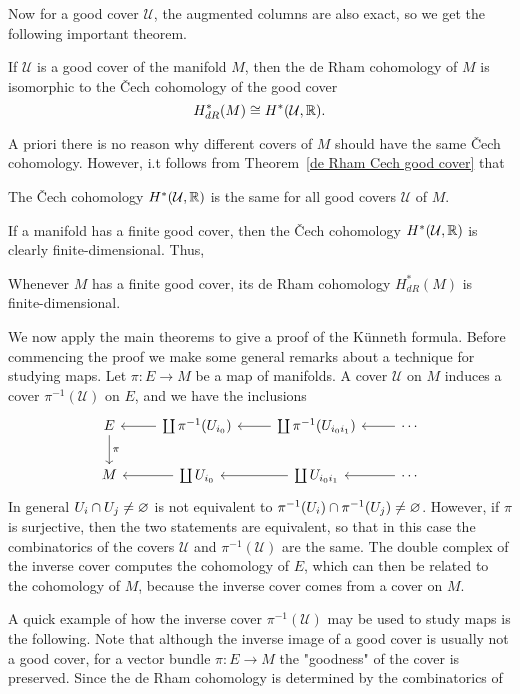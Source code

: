 Now for a good cover $\mathcal{U}$, the augmented columns are also exact, so we get the following important theorem.
\begin{theorem}\label{de Rham Cech good cover}
If $\mathcal{U}$ is a good cover of the manifold $M$, then the de Rham cohomology of $M$ is isomorphic to the \v{C}ech cohomology of the good cover
\[H^*_{dR}(M)\cong H^*(\mathcal{U},\mathbb{R}).\]
\end{theorem}
A priori there is no reason why different covers of $M$ should have the same \v{C}ech cohomology. However, i.t follows from Theorem~\ref{de Rham Cech good cover} that
\begin{corollary}
The \v{C}ech cohomology $H^*(\mathcal{U},\mathbb{R})$ is the same for all good covers $\mathcal{U}$ of $M$.
\end{corollary}
If a manifold has a finite good cover, then the \v{C}ech cohomology $H^*(\mathcal{U},\mathbb{R})$ is clearly finite-dimensional. Thus,
\begin{corollary}
Whenever $M$ has a finite good cover, its de Rham cohomology $H^*_{dR}(M)$ is finite-dimensional.
\end{corollary}
We now apply the main theorems to give a proof of the K\"unneth formula. Before commencing the proof we make some general remarks about a technique for studying maps. 
Let $\pi:E\to M$ be a map of manifolds. A cover $\mathcal{U}$ on $M$ induces a cover $\pi^{-1}(\mathcal{U})$ on $E$, and we have the inclusions
\[\begin{tikzcd}
E\ar[d,"\pi"]&\coprod\pi^{-1}(U_{i_0})\ar[l]&\coprod\pi^{-1}(U_{i_0i_1})\ar[l]&\cdots\ar[l]\\
M&\coprod U_{i_0}\ar[l]&\coprod U_{i_0i_1}\ar[l]&\cdots\ar[l]
\end{tikzcd}\]
In general $U_i\cap U_j\neq\varnothing$ is not equivalent to $\pi^{-1}(U_i)\cap \pi^{-1}(U_j)\neq\varnothing$. However, if $\pi$ is surjective, then the two statements are equivalent, 
so that in this case the combinatorics of the covers $\mathcal{U}$ and $\pi^{-1}(\mathcal{U})$ are the same. The double complex of the inverse cover computes the cohomology 
of $E$, which can then be related to the cohomology of $M$, because the inverse cover comes from a cover on $M$.\par
A quick example of how the inverse cover $\pi^{-1}(\mathcal{U})$ may be used to study maps is the following. Note that although the inverse image of a good cover is 
usually not a good cover, for a vector bundle $\pi:E\to M$ the "goodness" of the cover is preserved. Since the de Rham cohomology is determined by the combinatorics of 
